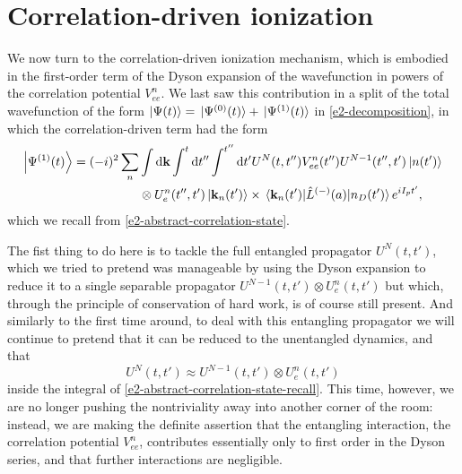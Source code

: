 \section{Correlation-driven ionization}
\label{sec:correlation-driven-ionization}
We now turn to the correlation-driven ionization mechanism, which is embodied in the first-order term of the Dyson expansion of the wavefunction in powers of the correlation potential $V_{ee}^n$. We last saw this contribution in a split of the total wavefunction of the form $\ket{\Psi(t)}=\ket*{\Psi^{(0)}(t)}+\ket*{\Psi^{(1)}(t)}$ in \eqref{e2-decomposition}, in which the correlation-driven term had the form
\begin{align}
\ket{\Psi^{(1)}(t)}
=(-i)^2\sum_n  & \int\d\vb{k}\int^t\d t''\int^{t''}\d t'U^N(t,t'')V_{ee}^n(t'') U^{N-1}(t'',t')\ket{n(t')}
\nonumber \\ & \otimes 
U_e^n(t'',t')\ket{\vb{k}_n(t')}\times\matrixel{\vb{k}_n(t')}{\hat{L}^{(-)}(a)}{n_D(t')}e^{iI_p t'},
\label{e2-abstract-correlation-state-recall}
\end{align}
which we recall from \eqref{e2-abstract-correlation-state}.

The fist thing to do here is to tackle the full entangled propagator $U^N(t,t')$, which we tried to pretend was manageable by using the Dyson expansion to reduce it to a single separable propagator $U^{N-1}(t,t') \otimes U_e^n(t,t')$ but which, through the principle of conservation of hard work, is of course still present. And similarly to the first time around, to deal with this entangling propagator we will continue to pretend that it can be reduced to the unentangled dynamics, and that
\begin{equation}
U^N(t,t') \approx U^{N-1}(t,t') \otimes U_e^n(t,t')
\end{equation}
inside the integral of \eqref{e2-abstract-correlation-state-recall}. This time, however, we are no longer pushing the nontriviality away into another corner of the room: instead, we are making the definite assertion that the entangling interaction, the correlation potential $V_{ee}^n$, contributes essentially only to first order in the Dyson series, and that further interactions are negligible.

